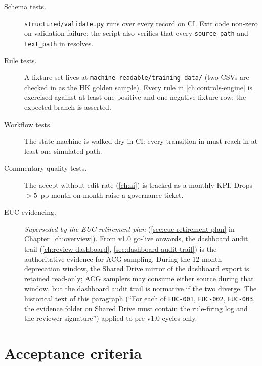 \begin{description}
  \item[Schema tests.] \corpus\texttt{structured/validate.py} runs
        over every record on CI. Exit code non-zero on validation
        failure; the script also verifies that every \texttt{source\_path}
        and \texttt{text\_path} in  resolves.
  \item[Rule tests.] A fixture set lives at
        \corpus\texttt{machine-readable/training-data/} (two CSVs are
        checked in as the HK golden sample). Every rule in
        \cref{ch:controls-engine} is exercised against at least one
        positive and one negative fixture row; the expected branch is
        asserted.
  \item[Workflow tests.] The state machine is walked dry in CI: every
        transition in  must reach
         in at least one simulated path.
  \item[Commentary quality tests.] The accept-without-edit rate
        (\cref{ch:ai}) is tracked as a monthly KPI. Drops $> 5$~pp
        month-on-month raise a governance ticket.
  \item[EUC evidencing.]\label{sec:controls-eucs}
        \emph{Superseded by the EUC retirement plan}
        (\cref{sec:euc-retirement-plan} in
        Chapter~\ref{ch:overview}). From v1.0 go-live onwards, the
        dashboard audit trail
        (\cref{ch:review-dashboard}, \cref{sec:dashboard-audit-trail}) is the
        authoritative evidence for ACG sampling. During the 12-month
        deprecation window, the Shared Drive mirror of the dashboard
        export is retained read-only; ACG samplers may consume either
        source during that window, but the dashboard audit trail is
        normative if the two diverge. The historical text of this
        paragraph (``For each of \texttt{EUC-001}, \texttt{EUC-002},
        \texttt{EUC-003}, the evidence folder on Shared Drive must
        contain the rule-firing log and the reviewer signature'')
        applied to pre-v1.0 cycles only.
\end{description}

\section{Acceptance criteria}

